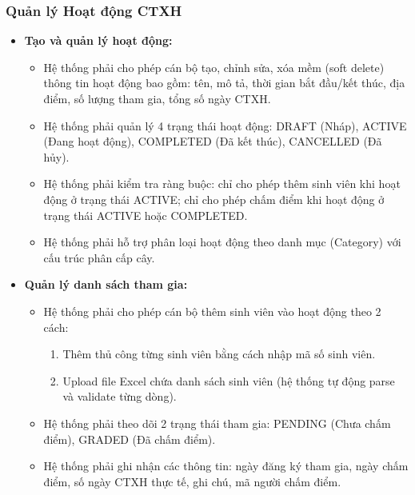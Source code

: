 \subsubsection{Quản lý Hoạt động CTXH}

\begin{itemize}
    \item \textbf{Tạo và quản lý hoạt động:}
    \begin{itemize}
        \item Hệ thống phải cho phép cán bộ tạo, chỉnh sửa, xóa mềm (soft delete) thông tin hoạt động bao gồm: tên, mô tả, thời gian bắt đầu/kết thúc, địa điểm, số lượng tham gia, tổng số ngày CTXH.
        \item Hệ thống phải quản lý 4 trạng thái hoạt động: DRAFT (Nháp), ACTIVE (Đang hoạt động), COMPLETED (Đã kết thúc), CANCELLED (Đã hủy).
        \item Hệ thống phải kiểm tra ràng buộc: chỉ cho phép thêm sinh viên khi hoạt động ở trạng thái ACTIVE; chỉ cho phép chấm điểm khi hoạt động ở trạng thái ACTIVE hoặc COMPLETED.
        \item Hệ thống phải hỗ trợ phân loại hoạt động theo danh mục (Category) với cấu trúc phân cấp cây.
    \end{itemize}
    
    \item \textbf{Quản lý danh sách tham gia:}
    \begin{itemize}
        \item Hệ thống phải cho phép cán bộ thêm sinh viên vào hoạt động theo 2 cách:
        \begin{enumerate}
            \item Thêm thủ công từng sinh viên bằng cách nhập mã số sinh viên.
            \item Upload file Excel chứa danh sách sinh viên (hệ thống tự động parse và validate từng dòng).
        \end{enumerate}
        \item Hệ thống phải theo dõi 2 trạng thái tham gia: PENDING (Chưa chấm điểm), GRADED (Đã chấm điểm).
        \item Hệ thống phải ghi nhận các thông tin: ngày đăng ký tham gia, ngày chấm điểm, số ngày CTXH thực tế, ghi chú, mã người chấm điểm.
    \end{itemize}
    

\end{itemize}
